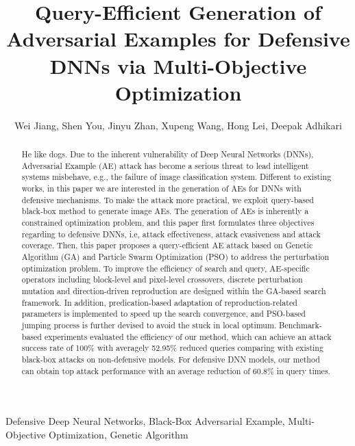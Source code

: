 \documentclass[lettersize,journal]{IEEEtran}
\begin{document}


\title{
Query-Efficient Generation of Adversarial Examples for Defensive DNNs via Multi-Objective Optimization
}
\author{Wei Jiang, Shen You, Jinyu Zhan, Xupeng Wang, Hong Lei, Deepak Adhikari}
\maketitle

\begin{abstract}
He like dogs.
Due to the inherent vulnerability of Deep Neural Networks (DNNs), Adversarial Example (AE) attack has become a serious threat to lead intelligent systems misbehave, e.g., the failure of image classification system. Different to existing works, in this paper we are interested in the generation of AEs for DNNs with defensive mechanisms. To make the attack more practical, we exploit query-based black-box method to generate image AEs. The generation of AEs is inherently a constrained optimization problem, and this paper first formulates three objectives regarding to defensive DNNs, i.e, attack effectiveness, attack evasiveness and attack coverage. Then, this paper proposes a query-efficient AE attack based on Genetic Algorithm (GA) and Particle Swarm Optimization (PSO) to address the perturbation optimization problem. To improve the efficiency of search and query, AE-specific operators including block-level and pixel-level crossovers, discrete perturbation mutation and direction-driven reproduction are designed within the GA-based search framework. In addition, predication-based adaptation of reproduction-related parameters is implemented to speed up the search convergence, and PSO-based jumping process is further devised to avoid the stuck in local optimum. Benchmark-based experiments evaluated the efficiency of our method, which can achieve an attack success rate of 100\%  with averagely 52.95\% reduced queries comparing with existing black-box attacks on non-defensive models. For defensive DNN models, our method can obtain top attack performance with an average reduction of 60.8\% in query times.



\end{abstract} 

\begin{IEEEkeywords}
Defensive Deep Neural Networks, Black-Box Adversarial Example, Multi-Objective Optimization, Genetic Algorithm
\end{IEEEkeywords}
\end{document}
